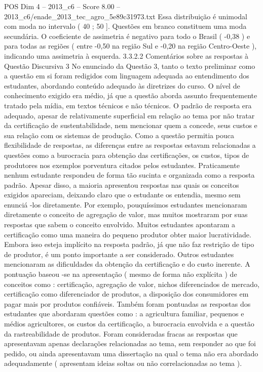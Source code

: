\begin{textsample}{POS Dim 4 – 2013\_c6 – Score 8.00 – 2013\_c6/enade\_2013\_tec\_agro\_5e89c31973.txt}
Essa distribuição é unimodal com moda no intervalo ( 40 ; 50 ].
Questões em branco constituem uma moda secundária.
O coeficiente de assimetria é negativo para todo o Brasil ( -0,38 ) e para todas as regiões ( entre -0,50 na região Sul e -0,20 na região Centro-Oeste ), indicando uma assimetria à esquerda. 3.3.2.2 Comentários sobre as respostas à Questão Discursiva 3 No enunciado da Questão 3, tanto o texto preliminar como a questão em si foram redigidos com linguagem adequada ao entendimento dos estudantes, abordando conteúdo adequado às diretrizes do curso.
O nível de conhecimento exigido era médio, já que a questão aborda assunto frequentemente tratado pela mídia, em textos técnicos e não técnicos.
O padrão de resposta era adequado, apesar de relativamente superficial em relação ao tema por não tratar da certificação de sustentabilidade, nem mencionar quem a concede, seus custos e sua relação com os sistemas de produção.
Como a questão permitia pouca flexibilidade de respostas, as diferenças entre as respostas estavam relacionadas a questões como a burocracia para obtenção das certificações, os custos, tipos de produtores nos exemplos porventura citados pelos estudantes.
Praticamente nenhum estudante respondeu de forma tão sucinta e organizada como a resposta padrão.
Apesar disso, a maioria apresentou respostas nas quais os conceitos exigidos apareciam, deixando claro que o estudante os entendia, mesmo sem enunciá -los diretamente.
Por exemplo, pouquíssimos estudantes mencionaram diretamente o conceito de agregação de valor, mas muitos mostraram por suas respostas que sabem o conceito envolvido.
Muitos estudantes apontaram a certificação como uma maneira do pequeno produtor obter maior lucratividade.
Embora isso esteja implícito na resposta padrão, já que não faz restrição de tipo de produtor, é um ponto importante a ser considerado.
Outros estudantes mencionaram as dificuldades da obtenção da certificação e do custo inerente.
A pontuação baseou -se na apresentação ( mesmo de forma não explícita ) de conceitos como : certificação, agregação de valor, nichos diferenciados de mercado, certificação como diferenciador de produtos, a disposição dos consumidores em pagar mais por produtos confiáveis.
Também foram pontuadas as respostas dos estudantes que abordaram questões como : a agricultura familiar, pequenos e médios agricultores, os custos da certificação, a burocracia envolvida e a questão da rastreabilidade de produtos.
Foram consideradas fracas as respostas que apresentavam apenas declarações relacionadas ao tema, sem responder ao que foi pedido, ou ainda apresentavam uma dissertação na qual o tema não era abordado adequadamente ( apresentam ideias soltas ou não correlacionadas ao tema ).

\end{textsample}

